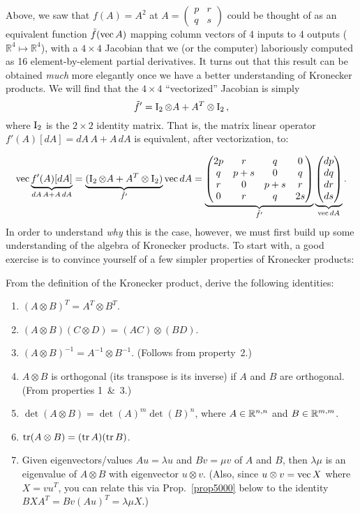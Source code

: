 Above, we saw that $f(A)=A^{2}$ at $A=\begin{pmatrix}p & r\\
q & s
\end{pmatrix}$ could be thought of as an equivalent function $\tilde{f}(\operatorname{vec} A)$
mapping column vectors of 4 inputs to 4 outputs ($\mathbb{R}^{4}\mapsto\mathbb{R}^{4}$),
with a $4\times4$ Jacobian that we (or the computer) laboriously
computed as 16 element-by-element partial derivatives. It turns out
that this result can be obtained \emph{much} more elegantly once we
have a better understanding of Kronecker products. We will find that
the $4\times4$ ``vectorized'' Jacobian is simply
\[
\tilde{f}'=\operatorname{I}_{2}\otimes A+A^{T}\otimes\operatorname{I}_{2}\,,
\]
where $\operatorname{I}_{2}$ is the $2\times2$ identity matrix. That is, the
matrix linear operator $f'(A)[dA]=dA\,A+A\,dA$ is equivalent, after
vectorization, to:

\[
\operatorname{vec}\underbrace{f'(A)[dA]}_{dA\,A+A\,dA}=\underbrace{(\operatorname{I}_{2}\otimes A+A^{T}\otimes\operatorname{I}_{2})}_{\tilde{f}'}\operatorname{vec} dA=\underbrace{\begin{pmatrix}2p & r & q & 0\\
q & p+s & 0 & q\\
r & 0 & p+s & r\\
0 & r & q & 2s
\end{pmatrix}}_{\tilde{f}'}\underbrace{\begin{pmatrix}dp\\
dq\\
dr\\
ds
\end{pmatrix}}_{\operatorname{vec} dA}.
\]
In order to understand \emph{why} this is the case, however, we must
first build up some understanding of the algebra of Kronecker products.
To start with, a good exercise is to convince yourself of a few simpler
properties of Kronecker products: \begin{problem} From the definition
of the Kronecker product, derive the following identities:
\begin{enumerate}
\item $(A\otimes B)^{T}=A^{T}\otimes B^{T}$.
\item $(A\otimes B)(C\otimes D)=(AC)\otimes(BD)$.
\item $(A\otimes B)^{-1}=A^{-1}\otimes B^{-1}$.  (Follows from property~2.)
\item $A\otimes B$ is orthogonal (its transpose is its inverse) if $A$
and $B$ are orthogonal. (From properties 1~\&~3.)
\item $\det(A\otimes B)=\det(A)^{m}\det(B)^{n}$, where $A\in\mathbb R^{n,n}$
and $B\in\mathbb R^{m,m}$.
\item $\operatorname{tr}(A\otimes B)=(\operatorname{tr} A)(\operatorname{tr} B)$.
\item Given eigenvectors/values $Au=\lambda u$ and $Bv=\mu v$ of $A$
and $B$, then $\lambda\mu$ is an eigenvalue of $A\otimes B$ with
eigenvector $u\otimes v$. (Also, since $u\otimes v=\operatorname{vec} X$ where
$X=vu^{T}$, you can relate this via Prop.~\ref{prop5000} below to the identity $BXA^{T}=Bv(Au)^T=\lambda\mu X$.) 
\end{enumerate}
\end{problem}

